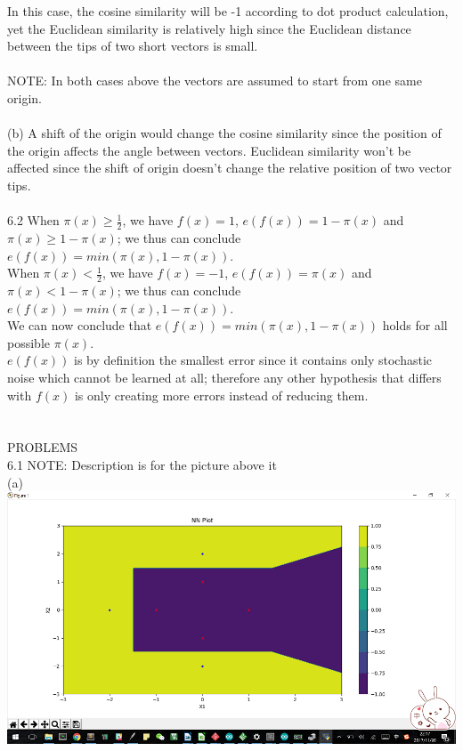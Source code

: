 \documentclass[12pt]{article}
\begin{document}
	In this case, the cosine similarity will be -1 according to dot product calculation, yet the Euclidean similarity is relatively high since the Euclidean distance between the tips of two short vectors is small. \\\\
	NOTE: In both cases above the vectors are assumed to start from one same origin.\\\\
(b) A shift of the origin would change the cosine similarity since the position of the origin affects the angle between vectors. Euclidean similarity won't be affected since the shift of origin doesn't change the relative position of two vector tips. \\\\ %
6.2 When $\pi(x)\geq \frac{1}{2}$, we have $f(x)=1$, $e(f(x))=1-\pi(x)$ and $\pi(x)\geq 1-\pi(x)$; we thus can conclude $e(f(x))=min(\pi(x),1-\pi(x))$.\\
 	When $\pi(x)< \frac{1}{2}$, we have $f(x)=-1$, $e(f(x))=\pi(x)$ and $\pi(x)< 1-\pi(x)$; we thus can conclude $e(f(x))=min(\pi(x),1-\pi(x))$.\\
 	We can now conclude that $e(f(x))=min(\pi(x),1-\pi(x))$ holds for all possible $\pi(x)$.\\
 	$e(f(x))$ is by definition the smallest error since it contains only stochastic noise which cannot be learned at all; therefore any other hypothesis that differs with $f(x)$ is only creating more errors instead of reducing them.\\\\\\ 
PROBLEMS\\
6.1 NOTE: Description is for the picture above it\\%
(a)\\
\includegraphics[scale=0.9]{images/1nn_no_tran}\\
\end{document}
